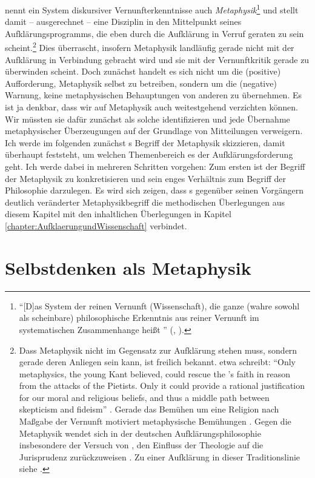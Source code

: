  nennt ein System diskursiver Vernunfterkenntnisse auch
\emph{Metaphysik}\footnote{\enquote{[D]as System der reinen Vernunft
(Wissenschaft), die ganze (wahre sowohl als scheinbare) philosophische
Erkenntnis aus reiner Vernunft im systematischen Zusammenhange {\punkt} heißt
} \mkbibparens{\cite[][869]{Kant:KritikderreinenVernunft2003},
\cite[][III: 543.29--544.2]{Kant:GesammelteWerke1900ff.}}.} und stellt damit --
ausgerechnet -- eine Disziplin in den Mittelpunkt seines Aufklärungsprogramms,
die eben durch die Aufklärung in Verruf geraten zu sein
scheint.\footnote{Dass Metaphysik nicht im Gegensatz zur Aufklärung stehen
muss, sondern gerade deren Anliegen sein kann, ist freilich bekannt.
 etwa schreibt:
\enquote{Only metaphysics, the young Kant believed, could rescue the
's faith in reason from the attacks of the Pietists. Only it could
provide a rational justification for our moral and religious beliefs, and thus a
middle path between skepticism and fideism}
\parencite[][30]{Beiser:Kantsintellectualdevelopment1992}. Gerade das Bemühen
um eine Religion nach Maßgabe der Vernunft motiviert metaphysische Bemühungen
\parencite[vgl.][]{Schmidt-Biggemann:MetaphysikalsProvokation2010}.
Gegen die Metaphysik wendet sich in der deutschen Aufklärungsphilosophie
insbesondere der Versuch von , den Einfluss der
Theologie auf die Jurisprudenz zurückzuweisen
\parencite[vgl.][602]{Hunter:ChristianThomasiusandtheDesacralizationofPhilosophy2000}.
Zu einer  Aufklärung in dieser Traditionslinie siehe
\cite[][passim.]{Hunter:RivalEnlightenments2001}.} Dies überrascht, insofern
Metaphysik landläufig gerade nicht mit der Aufklärung in Verbindung gebracht
wird und  sie mit der Vernunftkritik gerade zu überwinden
scheint. Doch zunächst handelt es sich nicht um die (positive) Aufforderung, Metaphysik
selbst zu betreiben, sondern um die (negative) Warnung, keine metaphysischen
Behauptungen von anderen zu übernehmen. Es ist ja denkbar, dass wir auf
Metaphysik auch weitestgehend verzichten können. Wir müssten sie dafür zunächst
als solche identifizieren und jede Übernahme metaphysischer Überzeugungen auf
der Grundlage von Mitteilungen verweigern. Ich werde im folgenden zunächst
s Begriff der Metaphysik skizzieren, damit überhaupt
feststeht, um welchen Themenbereich es der Aufklärungsforderung geht. Ich werde
dabei in mehreren Schritten vorgehen: Zum ersten ist der Begriff der Metaphysik zu konkretisieren und sein enges Verhältnis zum Begriff
der Philosophie darzulegen. Es wird sich zeigen, dass s
gegenüber seinen Vorgängern deutlich veränderter Metaphysikbegriff die
methodischen Überlegungen aus diesem Kapitel mit den inhaltlichen Überlegungen
in Kapitel \ref{chapter:AufklaerungundWissenschaft} verbindet.

\section{Selbstdenken als
Metaphysik}\label{section:MetaphysikausderPerspektivedesMenschen}

